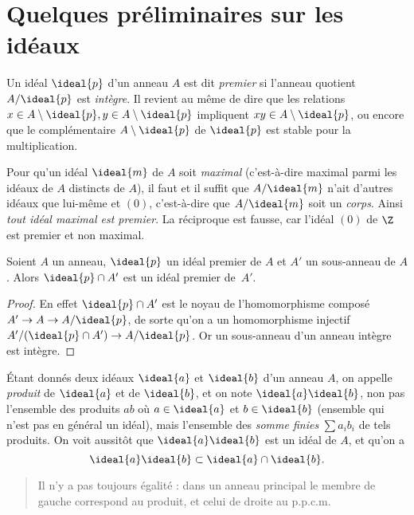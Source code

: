 \documentclass[11pt, useosf,
  title in boldface,
  theorem in new line,
  theorem numbering = section,
  number theorems separately,
]{simplivre}
\begin{document}
\section{Quelques préliminaires sur les idéaux}\label{sec:quelques préliminaires sur les idéaux}

    Un idéal \( \ideal{p} \) d'un anneau \( A \) est dit \emph{premier} si l'anneau quotient \( A/\ideal{p} \) est \emph{intègre}. Il revient au même de dire que les relations \( x \in A \setminus \ideal{p}, y \in A \setminus \ideal{p} \) impliquent \( xy \in A \setminus \ideal{p} \), ou encore que le complémentaire \( A \setminus \ideal{p} \) de \( \ideal{p} \) est stable pour la multiplication.

    Pour qu'un idéal \( \ideal{m} \) de \( A \) soit \emph{maximal} (c'est-à-dire maximal parmi les idéaux de \( A \) distincts de \( A \)), il faut et il suffit que \( A/\ideal{m} \) n'ait d'autres idéaux que lui-même et \( (0) \), c'est-à-dire que \( A/\ideal{m} \) soit un \emph{corps}. Ainsi \emph{tout idéal maximal est premier}. La réciproque est fausse, car l'idéal \( (0) \) de \( \Z \) est premier et non maximal.

    \begin{lemma}\label{lem:intersection d'un idéal premier et un sous-anneau est un idéal premier}
        Soient \( A \) un anneau, \( \ideal{p} \) un idéal premier de \( A \) et \( A' \) un sous-anneau de \( A \). Alors \( \ideal{p} \cap A' \) est un idéal premier de~\( A' \).
    \end{lemma}
    \begin{proof}
        En effet \( \ideal{p} \cap A' \) est le noyau de l'homomorphisme composé \( A' \to A \to A/\ideal{p} \), de sorte qu'on a un homomorphisme injectif \( A'/(\ideal{p} \cap A') \to A/\ideal{p} \). Or un sous-anneau d'un anneau intègre est intègre.
    \end{proof}

    Étant donnés deux idéaux \( \ideal{a} \) et \( \ideal{b} \) d'un anneau \( A \), on appelle \emph{produit} de \( \ideal{a} \) et de \( \ideal{b} \), et on note \( \ideal{a}\ideal{b} \), non pas l'ensemble des produits \( ab \) où \( a \in \ideal{a} \) et \( b \in \ideal{b} \) (ensemble qui n'est pas en général un idéal), mais l'ensemble des \emph{somme finies} \( \sum a_i b_i \) de tels produits. On voit aussitôt que \( \ideal{a}\ideal{b} \) est un idéal de \( A \), et qu'on a
    \begin{equation}
        \ideal{a}\ideal{b} \subset \ideal{a} \cap \ideal{b}.
    \end{equation}
    \begin{quote}
        Il n'y a pas toujours égalité : dans un anneau principal le membre de gauche correspond au produit, et celui de droite au p.p.c.m.
    \end{quote}
\end{document}
